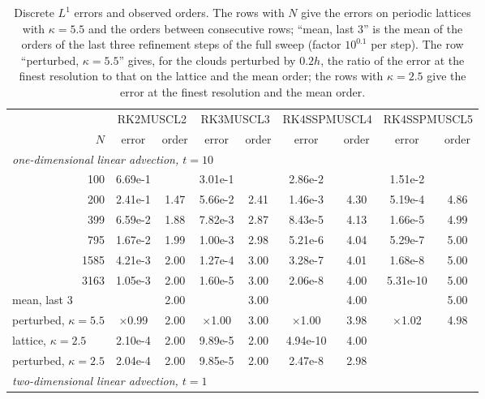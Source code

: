 \documentclass[smallextended]{svjour3}
\numberwithin{equation}{section}
\begin{document}
\begin{table}[!htbp]
\centering
\caption{Discrete $L^1$ errors and observed orders. The rows with $N$ give the errors on periodic lattices with $\kappa=5.5$ and the orders between consecutive rows; ``mean, last 3'' is the mean of the orders of the last three refinement steps of the full sweep (factor $10^{0.1}$ per step). The row ``perturbed, $\kappa=5.5$'' gives, for the clouds perturbed by $0.2h$, the ratio of the error at the finest resolution to that on the lattice and the mean order; the rows with $\kappa=2.5$ give the error at the finest resolution and the mean order.}\label{tab:convergence}
\small
\setlength{\tabcolsep}{4.5pt}
\begin{adjustbox}{max width=\textwidth}
\begin{tabular}{rcccccccc}
\toprule
& \multicolumn{2}{c}{RK2MUSCL2} & \multicolumn{2}{c}{RK3MUSCL3} & \multicolumn{2}{c}{RK4SSPMUSCL4} & \multicolumn{2}{c}{RK4SSPMUSCL5}\\
\cmidrule(lr){2-3}\cmidrule(lr){4-5}\cmidrule(lr){6-7}\cmidrule(lr){8-9}
$N$ & error & order & error & order & error & order & error & order\\
\midrule
\multicolumn{9}{l}{\emph{one-dimensional linear advection, $t=10$}}\\
100 & 6.69e-1 &  & 3.01e-1 &  & 2.86e-2 &  & 1.51e-2 & \\
200 & 2.41e-1 & 1.47 & 5.66e-2 & 2.41 & 1.46e-3 & 4.30 & 5.19e-4 & 4.86\\
399 & 6.59e-2 & 1.88 & 7.82e-3 & 2.87 & 8.43e-5 & 4.13 & 1.66e-5 & 4.99\\
795 & 1.67e-2 & 1.99 & 1.00e-3 & 2.98 & 5.21e-6 & 4.04 & 5.29e-7 & 5.00\\
1585 & 4.21e-3 & 2.00 & 1.27e-4 & 3.00 & 3.28e-7 & 4.01 & 1.68e-8 & 5.00\\
3163 & 1.05e-3 & 2.00 & 1.60e-5 & 3.00 & 2.06e-8 & 4.00 & 5.31e-10 & 5.00\\
\multicolumn{1}{l}{mean, last 3} &  & 2.00 &  & 3.00 &  & 4.00 &  & 5.00\\
\multicolumn{1}{l}{perturbed, $\kappa=5.5$} & $\times$0.99 & 2.00 & $\times$1.00 & 3.00 & $\times$1.00 & 3.98 & $\times$1.02 & 4.98\\
\multicolumn{1}{l}{lattice, $\kappa=2.5$} & 2.10e-4 & 2.00 & 9.89e-5 & 2.00 & 4.94e-10 & 4.00 &  & \\
\multicolumn{1}{l}{perturbed, $\kappa=2.5$} & 2.04e-4 & 2.00 & 9.85e-5 & 2.00 & 2.47e-8 & 2.98 &  & \\
\midrule
\multicolumn{9}{l}{\emph{two-dimensional linear advection, $t=1$}}\\

\end{tabular}
\end{adjustbox}
\end{table}
\end{document}
